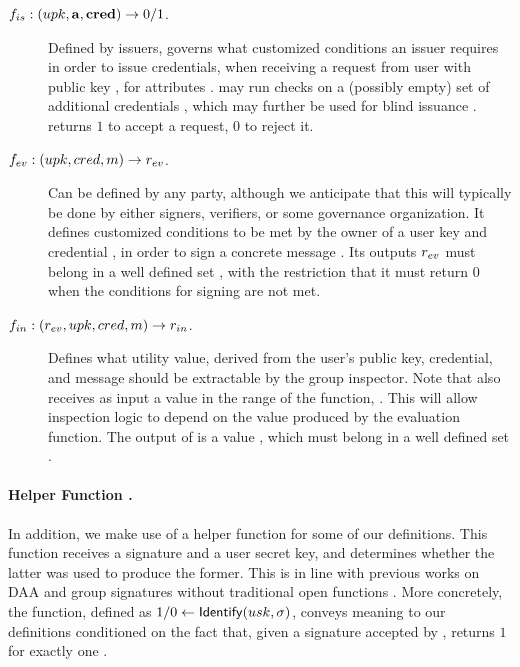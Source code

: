 \begin{description}
\item[$f_{is}: (upk, \mathbf{a},\mathbf{cred}) \rightarrow 0/1$.] Defined by issuers,
  governs what customized conditions an issuer requires in order to issue
  credentials, when receiving a request from user with public key \upk, for
  attributes \attrs. \fissue may run checks on a (possibly empty) set of
  additional credentials \scred, which may further be used for blind issuance
  . \fissue returns $1$ to accept a request, $0$ to
  reject it.  
\item[$f_{ev}: (upk,cred,m) \rightarrow r_{ev}$.] Can be defined by any
  party, although we anticipate that this will typically be done by either
  signers, verifiers, or some governance organization. It defines customized
  conditions to be met by the owner of a user key \upk and credential \cred,
  in order to sign a concrete message \msg. Its outputs  $r_{ev}$ must
  belong in a well defined set \rngfeval, with the restriction that it must
  return $0$ when the conditions for signing are not met.
\item[$f_{in}: (r_{ev},upk,cred,m) \rightarrow r_{in}$.]
  Defines what utility value, derived from the user's public key, credential,
  and message should be extractable by the group inspector. Note that \finsp
  also receives as input a value in the range of the \feval function, \rngfeval.
  This will allow inspection logic to depend on the value produced by the
  evaluation function. The output of \finsp is a value \varrngfinsp, which must
  belong in a well defined set \rngfinsp.
\end{description}

\paragraph{Helper Function \Identify.} In addition, we make use of a helper
function \Identify for some of our definitions. This function receives
a signature and a user secret key, and determines whether the latter was used
to produce the former. This is in line with previous works on DAA
\cite{bfg+11,cdl16} and group signatures without traditional open functions
\cite{dl21,fgl21,gl19}. More concretely, the \Identify function, defined as $1/0
\gets \mathsf{Identify}(usk,\sigma)$, conveys meaning to our definitions conditioned on
the fact that, given a signature \sig accepted by \Verify, \Identify returns $1$
for exactly one \usk.

